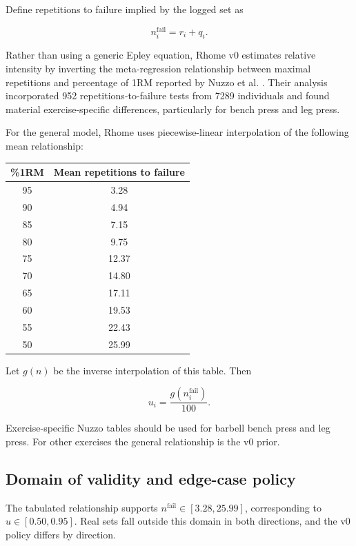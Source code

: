 \documentclass[11pt]{article}
\begin{document}
Define repetitions to failure implied by the logged set as

\begin{equation}
n_i^{\mathrm{fail}}=r_i+q_i.
\end{equation}

Rather than using a generic Epley equation, Rhome v0 estimates relative intensity by inverting the meta-regression relationship between maximal repetitions and percentage of 1RM reported by Nuzzo et al. \cite{nuzzo2024}. Their analysis incorporated 952 repetitions-to-failure tests from 7289 individuals and found material exercise-specific differences, particularly for bench press and leg press.

For the general model, Rhome uses piecewise-linear interpolation of the following mean relationship:

\begin{center}
\begin{tabular}{cc}
\toprule
\%1RM & Mean repetitions to failure \\
\midrule
95 & 3.28 \\
90 & 4.94 \\
85 & 7.15 \\
80 & 9.75 \\
75 & 12.37 \\
70 & 14.80 \\
65 & 17.11 \\
60 & 19.53 \\
55 & 22.43 \\
50 & 25.99 \\
\bottomrule
\end{tabular}
\end{center}

Let $g(n)$ be the inverse interpolation of this table. Then

\begin{equation}
u_i = \frac{g(n_i^{\mathrm{fail}})}{100}.
\end{equation}

Exercise-specific Nuzzo tables should be used for barbell bench press and leg press. For other exercises the general relationship is the v0 prior.

\subsection{Domain of validity and edge-case policy}

The tabulated relationship supports $n^{\mathrm{fail}}\in[3.28,25.99]$, corresponding to $u\in[0.50,0.95]$. Real sets fall outside this domain in both directions, and the v0 policy differs by direction.
\end{document}
